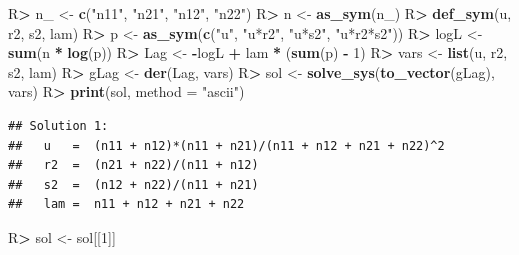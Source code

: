 \documentclass[10pt,]{article}
\newenvironment{Shaded}{\begin{snugshade}}{\end{snugshade}}
\newcommand{\DataTypeTok}[1]{\textcolor[rgb]{0.13,0.29,0.53}{#1}}
\newcommand{\DecValTok}[1]{\textcolor[rgb]{0.00,0.00,0.81}{#1}}
\newcommand{\KeywordTok}[1]{\textcolor[rgb]{0.13,0.29,0.53}{\textbf{#1}}}
\newcommand{\NormalTok}[1]{#1}
\newcommand{\OperatorTok}[1]{\textcolor[rgb]{0.81,0.36,0.00}{\textbf{#1}}}
\newcommand{\StringTok}[1]{\textcolor[rgb]{0.31,0.60,0.02}{#1}}
\begin{document}
\begin{Shaded}
\begin{Highlighting}[]
\NormalTok{R}\OperatorTok{>}\StringTok{ }\NormalTok{n_ <-}\StringTok{ }\KeywordTok{c}\NormalTok{(}\StringTok{"n11"}\NormalTok{, }\StringTok{"n21"}\NormalTok{, }\StringTok{"n12"}\NormalTok{, }\StringTok{"n22"}\NormalTok{)}
\NormalTok{R}\OperatorTok{>}\StringTok{ }\NormalTok{n  <-}\StringTok{ }\KeywordTok{as_sym}\NormalTok{(n_)}
\NormalTok{R}\OperatorTok{>}\StringTok{ }\KeywordTok{def_sym}\NormalTok{(u, r2, s2, lam)}
\NormalTok{R}\OperatorTok{>}\StringTok{ }\NormalTok{p <-}\StringTok{ }\KeywordTok{as_sym}\NormalTok{(}\KeywordTok{c}\NormalTok{(}\StringTok{"u"}\NormalTok{, }\StringTok{"u*r2"}\NormalTok{, }\StringTok{"u*s2"}\NormalTok{, }\StringTok{"u*r2*s2"}\NormalTok{))}
\NormalTok{R}\OperatorTok{>}\StringTok{ }\NormalTok{logL  <-}\StringTok{ }\KeywordTok{sum}\NormalTok{(n }\OperatorTok{*}\StringTok{ }\KeywordTok{log}\NormalTok{(p))}
\NormalTok{R}\OperatorTok{>}\StringTok{ }\NormalTok{Lag  <-}\StringTok{ }\OperatorTok{-}\NormalTok{logL }\OperatorTok{+}\StringTok{ }\NormalTok{lam }\OperatorTok{*}\StringTok{ }\NormalTok{(}\KeywordTok{sum}\NormalTok{(p) }\OperatorTok{-}\StringTok{ }\DecValTok{1}\NormalTok{) }
\NormalTok{R}\OperatorTok{>}\StringTok{ }\NormalTok{vars <-}\StringTok{ }\KeywordTok{list}\NormalTok{(u, r2, s2, lam)}
\NormalTok{R}\OperatorTok{>}\StringTok{ }\NormalTok{gLag <-}\StringTok{ }\KeywordTok{der}\NormalTok{(Lag, vars)}
\NormalTok{R}\OperatorTok{>}\StringTok{ }\NormalTok{sol <-}\StringTok{ }\KeywordTok{solve_sys}\NormalTok{(}\KeywordTok{to_vector}\NormalTok{(gLag), vars)}
\NormalTok{R}\OperatorTok{>}\StringTok{ }\KeywordTok{print}\NormalTok{(sol, }\DataTypeTok{method =} \StringTok{"ascii"}\NormalTok{)}
\end{Highlighting}
\end{Shaded}

\begin{verbatim}
## Solution 1:
##   u   =  (n11 + n12)*(n11 + n21)/(n11 + n12 + n21 + n22)^2 
##   r2  =  (n21 + n22)/(n11 + n12) 
##   s2  =  (n12 + n22)/(n11 + n21) 
##   lam =  n11 + n12 + n21 + n22
\end{verbatim}

\begin{Shaded}
\begin{Highlighting}[]
\NormalTok{R}\OperatorTok{>}\StringTok{ }\NormalTok{sol <-}\StringTok{ }\NormalTok{sol[[}\DecValTok{1}\NormalTok{]]}
\end{Highlighting}
\end{Shaded}
\end{document}
